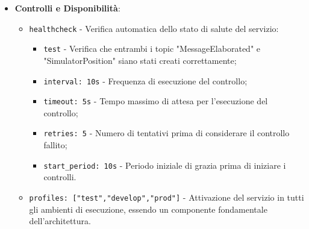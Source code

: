 \documentclass[10pt]{article}
\begin{document}
\begin{itemize}
        \item \textbf{Controlli e Disponibilità}:
        \begin{itemize}
            \item \texttt{healthcheck} - Verifica automatica dello stato di salute del servizio:
            \begin{itemize}
                \item \texttt{test} - Verifica che entrambi i topic "MessageElaborated" e "SimulatorPosition" siano stati creati correttamente;
                \item \texttt{interval: 10s} - Frequenza di esecuzione del controllo;
                \item \texttt{timeout: 5s} - Tempo massimo di attesa per l'esecuzione del controllo;
                \item \texttt{retries: 5} - Numero di tentativi prima di considerare il controllo fallito;
                \item \texttt{start\_period: 10s} - Periodo iniziale di grazia prima di iniziare i controlli.
            \end{itemize}
            \item \texttt{profiles: ["test","develop","prod"]} - Attivazione del servizio in tutti gli ambienti di esecuzione, essendo un componente fondamentale dell'architettura.
        \end{itemize}
        \end{itemize}
        
\end{document}
